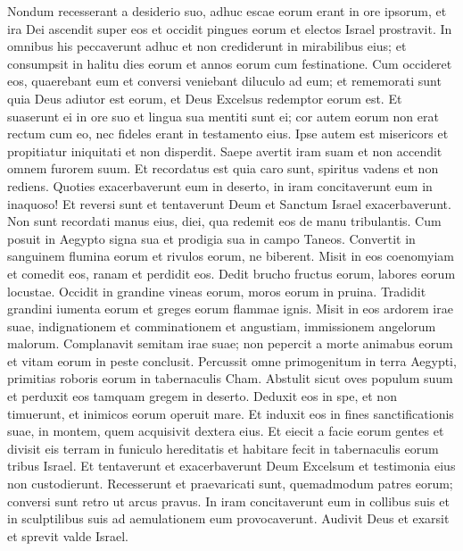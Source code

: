 \begin{biblechapter}
\verse Nondum recesserant a desiderio suo, adhuc escae eorum erant in ore ipsorum, 
\verse et ira Dei ascendit super eos et occidit pingues eorum et electos Israel prostravit. 
\verse In omnibus his peccaverunt adhuc et non crediderunt in mirabilibus eius; 
\verse et consumpsit in halitu dies eorum et annos eorum cum festinatione. 
\verse Cum occideret eos, quaerebant eum et conversi veniebant diluculo ad eum; 
\verse et rememorati sunt quia Deus adiutor est eorum, et Deus Excelsus redemptor eorum est. 
\verse Et suaserunt ei in ore suo et lingua sua mentiti sunt ei; 
\verse cor autem eorum non erat rectum cum eo, nec fideles erant in testamento eius. 
\verse Ipse autem est misericors et propitiatur iniquitati et non disperdit. Saepe avertit iram suam et non accendit omnem furorem suum. 
\verse Et recordatus est quia caro sunt, spiritus vadens et non rediens. 
\verse Quoties exacerbaverunt eum in deserto, in iram concitaverunt eum in inaquoso! 
\verse Et reversi sunt et tentaverunt Deum et Sanctum Israel exacerbaverunt. 
\verse Non sunt recordati manus eius, diei, qua redemit eos de manu tribulantis. 
\verse Cum posuit in Aegypto signa sua et prodigia sua in campo Taneos. 
\verse Convertit in sanguinem flumina eorum et rivulos eorum, ne biberent. 
\verse Misit in eos coenomyiam et comedit eos, ranam et perdidit eos. 
\verse Dedit brucho fructus eorum, labores eorum locustae. 
\verse Occidit in grandine vineas eorum, moros eorum in pruina. 
\verse Tradidit grandini iumenta eorum et greges eorum flammae ignis. 
\verse Misit in eos ardorem irae suae, indignationem et comminationem et angustiam, immissionem angelorum malorum. 
\verse Complanavit semitam irae suae; non pepercit a morte animabus eorum et vitam eorum in peste conclusit. 
\verse Percussit omne primogenitum in terra Aegypti, primitias roboris eorum in tabernaculis Cham. 
\verse Abstulit sicut oves populum suum et perduxit eos tamquam gregem in deserto. 
\verse Deduxit eos in spe, et non timuerunt, et inimicos eorum operuit mare. 
\verse Et induxit eos in fines sanctificationis suae, in montem, quem acquisivit dextera eius. 
\verse Et eiecit a facie eorum gentes et divisit eis terram in funiculo hereditatis et habitare fecit in tabernaculis eorum tribus Israel. 
\verse Et tentaverunt et exacerbaverunt Deum Excelsum et testimonia eius non custodierunt. 
\verse Recesserunt et praevaricati sunt, quemadmodum patres eorum; conversi sunt retro ut arcus pravus. 
\verse In iram concitaverunt eum in collibus suis et in sculptilibus suis ad aemulationem eum provocaverunt. 
\verse Audivit Deus et exarsit et sprevit valde Israel. 

\end{biblechapter}
